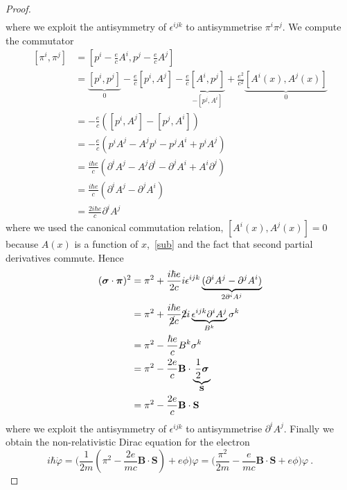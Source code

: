 \begin{proof}
\begin{equation*}
\begin{aligned}
        \end{aligned}
        \end{equation*}
        where we exploit the antisymmetry of $\epsilon^{ijk}$ to antisymmetrise $\pi^i \pi^j$. We compute the commutator
        \begin{equation*}
        \begin{aligned}
            [\pi^i, \pi^j] & = [p^i - \frac{e}{c} A^i, p^j - \frac{e}{c} A^j] \\ & = \underbrace{[p^i, p^j]}_0 - \frac{e}{c} [p^i, A^j] - \frac{e}{c} \underbrace{[A^i, p^j]}_{- [p^j, A^i]} + \frac{e^2}{c^2} \underbrace{[A^i(x), A^j(x)]}_0 \\ & = - \frac{e}{c} ([p^i, A^j] - [p^j, A^i]) \\ & = - \frac{e}{c} (p^i A^j - A^j p^i - p^j A^i + p^i A^j) \\ & = \frac{i \hbar e}{c} (\partial^i A^j - A^j \partial^i - \partial^j A^i + A^i \partial^j ) \\ & =\frac{i \hbar e}{c} (\partial^i A^j - \partial^j A^i) \\ & = \frac{2 i \hbar e}{c} \partial^i A^j
        \end{aligned}
        \end{equation*}
        where we used the canonical commutation relation, $[A^i(x), A^j(x)] = 0$ because $A(x)$ is a function of $x$,~\eqref{sub} and the fact that second partial derivatives commute. Hence 
        \begin{equation*}
        \begin{aligned}
            (\boldsymbol \sigma \cdot \boldsymbol \pi)^2 & = \pi^2 + \frac{i \hbar e}{2 c} i \epsilon^{ijk} \underbrace{(\partial^i A^j - \partial^j A^i)}_{2 \partial^i A^j} \\ & = \pi^2 + \frac{i \hbar e}{\cancel{2} c} \cancel{2} i \underbrace{\epsilon^{ijk} \partial^i A^j}_{B^k} \sigma^k \\ & = \pi^2 - \frac{\hbar e}{c} B^k \sigma^k \\ & = \pi^2 - \frac{2e}{c} \mathbf B \cdot \underbrace{\frac{1}{2} \boldsymbol \sigma}_{\mathbf S} \\ & = \pi^2 - \frac{2e}{c} \mathbf B \cdot \mathbf S
        \end{aligned}
        \end{equation*}
        where we exploit the antisymmetry of $\epsilon^{ijk}$ to antisymmetrise $\partial^i A^j$. Finally we obtain the non-relativistic Dirac equation for the electron
        \begin{equation*}
            i \hbar \dot \varphi = \Big ( \frac{1}{2m} (\pi^2 - \frac{2e}{mc} \mathbf B \cdot \mathbf S) + e \phi \Big) \varphi = \Big ( \frac{\pi^2}{2m} - \frac{e}{mc} \mathbf B \cdot \mathbf S + e \phi \Big) \varphi ~. 
        \end{equation*}
    \end{proof}

